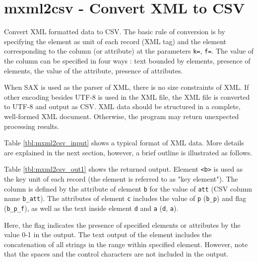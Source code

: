 %

\section{mxml2csv - Convert XML to CSV \label{sect:mxml2csv}}
Convert XML formatted data to CSV.
The basic rule of conversion is by specifying the element as unit of each record (XML tag) and the element corresponding to the column (or attribute) at the parameters \verb|k=|, \verb|f=|.
The value of the column can be specified in four ways :  text bounded by elements, presence of elements, the value of the attribute, presence of attributes.

When SAX is used as the parser of XML, there is no size constraints of XML.
If  other encoding besides UTF-8 is used in the XML file, the XML file is converted to UTF-8 and output as CSV.
XML data should be structured in a complete, well-formed XML document. Otherwise, the program may return unexpected processing results.

Table \ref{tbl:mxml2csv_input} shows a typical format of XML data.
More details are explained in the next section, however, a brief outline is illustrated as follows.

Table \ref{tbl:mxml2csv_out1} shows the returned output. Element  \verb|<b>| is used as the key unit of each record  (the element is referred to as "key element"). The column is defined by the attribute of element \verb|b| for the value of \verb|att|  (CSV column name \verb|b_att|). The attributes of element \verb|c| includes the value of \verb|p| (\verb|b_p|) and flag (\verb|b_p_f|), as well as the text inside element \verb|d| and \verb|a| (\verb|d|, \verb|a|).  

Here, the flag indicates the presence of specified elements or attributes by the value 0-1 in the output.
The text output of the element includes the concatenation of all strings in the range within specified element. However, note that the spaces and the control characters are not included in the output.

